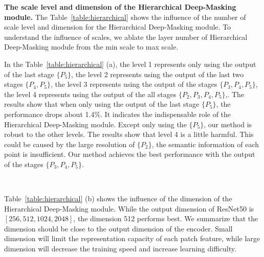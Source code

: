 \documentclass[10pt,twocolumn,letterpaper]{article}
\begin{document}
\noindent\textbf{The scale level and dimension of the Hierarchical Deep-Masking module.}
The Table~\ref{table:hierarchical} shows the influence of the number of scale level and dimension for the Hierarchical Deep-Masking module. To understand the influence of scales, we ablate the layer number of Hierarchical Deep-Masking module from the min scale to max scale. 

In the Table~\ref{table:hierarchical} (a), the level 1 represents only using the output of the last stage $\{P_5\}$, the level 2 represents using the output of the last two stages $\{P_4, P_5\}$, the level 3 represents using the output of the stages $\{P_3, P_4, P_5\}$, the level 4 represents using the output of the all stages $\{P_2, P_3, P_4, P_5\}$,. The results show that when only using the output of the last stage $\{P_5\}$, the performance drops about 1.4\%. It indicates the indispensable role of the Hierarchical Deep-Masking module. Except only using the $\{P_5\}$, our method is robust to the other levels. The results show that level 4 is a little harmful. This could be caused by the large resolution of $\{P_2\}$, the semantic information of each point is insufficient. Our method achieves the best performance with the output of the stages $\{P_3, P_4, P_5\}$. 

\begin{table}[h]
    \centering
    \caption{The analysis for the scale level and dimension of the Hierarchical Deep-Masking module.}
    \label{table:hierarchical}
    \subfloat[Scale Level.]{
        \begin{tabular}{ccccc}
        \toprule
        Level   &  1 & 2 & 3 & 4 \\
        \midrule 
        Top1 & 67.4 & 68.7 & \textbf{68.8}  & 68.6 \\
        \bottomrule
        \end{tabular}
	}
    \\
    \subfloat[Dimension.]{
        \begin{tabular}{ccccc}
        \toprule
        Dim   & 256 & 512 & 1024 \\
        \midrule
        Top1 & 68.5 & \textbf{68.8} & 68.6 \\
        \bottomrule
        \end{tabular}
	}
\end{table}

Table~\ref{table:hierarchical} (b) shows the influence of the dimension of the Hierarchical Deep-Masking module. While the output dimension of ResNet50 is $[256,512,1024,2048]$, the dimension 512 performs best. We summarize that the dimension should be close to the output dimension of the encoder. 
Small dimension will limit the representation capacity of each patch feature, while large dimension will decrease the training speed and increase learning difficulty.
\end{document}
